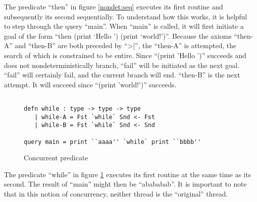 The predicate “then” in figure \ref{nondet:seq} executes its first routine and subsequently its second sequentially.
To understand how this works, it is helpful to step through the query
“main”. When “main” is called, it will first initiate a goal of the form “then (print ‘Hello
’) (print ‘world!’)”. Because the axioms “then-A” and “then-B” are both preceded by ``>|'',
the “then-A” is attempted, the search of which is constrained to be entire. Since “(print
’Hello ’)” succeeds and does not nondeterministically branch, “fail” will be initiated as
the next goal. ``fail'' will certainly fail, and the current branch will end. “then-B” is the
next attempt. It will succeed since “(print ’world!’)” succeeds.

\begin{figure}[H]
\begin{lstlisting}

defn while : type -> type -> type
   | while-A = Fst `while` Snd <- Fst
   | while-B = Fst `while` Snd <- Snd

query main = print ``aaaa'' `while` print ``bbbb''

\end{lstlisting}
\caption{Concurrent predicate}
\label{nondet:con}
\end{figure}


The predicate “while” in figure \ref{nondet:con} executes its first routine at the same time as its
second. The result of “main” might then be “abababab”. It is important to note that in this notion of concurrency, neither thread is the ``original'' thread.
